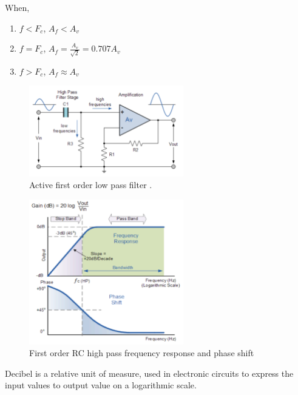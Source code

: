 \newpage

When,
\begin{enumerate}
    \item $f < F_c$, $A_f < A_v$
    \item $f = F_c$, $A_f = \frac{A_v}{\sqrt{2}} = 0.707 A_v$
    \item$f > F_c$, $A_f \approx A_v$
\end{enumerate}


\begin{figure}[h]
    \centering
    \includegraphics[width=0.60\textwidth]{graphics/highPassFilter.png}
    \caption{Active first order low pass filter \cite{noauthor_active_2013}.}
    \label{fig:HighPassFiler}
\end{figure}

\begin{figure}[h]
    \centering
    \includegraphics[width=0.60\textwidth]{graphics/highPassResponse.png}
    \caption{First order RC high pass frequency response and phase shift \cite{noauthor_high_2013}}
    \label{fig:HighPassResponse}
\end{figure}

\vspace{4cm}

Decibel is a relative unit of measure, used in electronic circuits to express the input values to output value on a logarithmic scale.  

